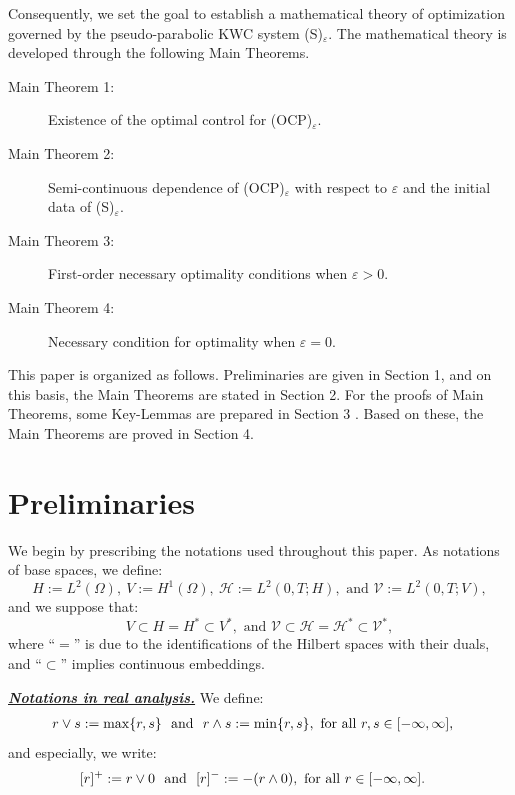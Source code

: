 \documentclass{sinst}
\numberwithin{equation}{section}
\theoremstyle{plain}
\theoremstyle{definition}
\def\sH{\mathscr{H}}
\def\sV{\mathscr{V}}
\begin{document}
Consequently, we set the goal to establish a mathematical theory of optimization governed by the pseudo-parabolic KWC system (S)$_\varepsilon$. The mathematical theory is developed through the following Main Theorems.
\begin{description}
    \item[Main Theorem 1:]Existence of the optimal control for (OCP)$_\varepsilon$.
        \vspace{-1ex}
    \item[Main Theorem 2:]Semi-continuous dependence of (OCP)$_\varepsilon$ with respect to $ \varepsilon $ and the initial data of (S)$_\varepsilon$.
        \vspace{-1ex}
    \item[Main Theorem 3:]First-order necessary optimality conditions when $ \varepsilon > 0 $.
        \vspace{-1ex}
    \item[Main Theorem 4:]Necessary condition for optimality when $ \varepsilon = 0 $.
\end{description}

This paper is organized as follows. Preliminaries are given in Section 1, and on this basis, the Main Theorems are stated in Section 2. For the proofs of Main Theorems, some Key-Lemmas are prepared in Section 3 . Based on these, the Main Theorems are proved in Section 4.

\section{Preliminaries}
We begin by prescribing the notations used throughout this paper. 
\smallskip
As notations of base spaces, we define:
\begin{equation*}
    H := L^2(\Omega), \ V := H^1(\Omega), ~ 
    \sH := L^2(0,T;H),  \mbox{ and } \sV := L^2(0,T;V),
\end{equation*}
and we suppose that:
\begin{equation}
    V \subset H = H^* \subset V^*, \mbox{ and } \sV \subset \sH = \sH^* \subset \sV^*,
\end{equation}
where ``$=$'' is due to the identifications of the Hilbert spaces with their duals, and ``$\subset$'' implies continuous embeddings.
\smallskip

\noindent
\underline{\textbf{\textit{Notations in real analysis.}}}
We define:
\begin{align*}
    & r \vee s := \max \{ r, s \} ~ \mbox{ and } ~ r \wedge s := \min \{r, s\}, \mbox{ for all $ r, s \in [-\infty, \infty] $,}
\end{align*}
and especially, we write:
\begin{align*}
    & [r]^+ := r \vee 0 ~ \mbox{ and } ~ [r]^- := -(r \wedge 0), \mbox{ for all $ r \in [-\infty, \infty] $.}
\end{align*}
\end{document}
